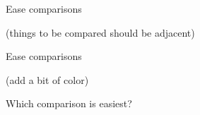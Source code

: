 \documentclass[aspectratio=169,12pt,t]{beamer}
\begin{document}
\begin{frame}{Ease comparisons}

\hilit (things to be compared should be adjacent)

\bigskip


\note{
}
\end{frame}





\begin{frame}{Ease comparisons}

\hilit (add a bit of color)

\bigskip


\note{
}
\end{frame}




\begin{frame}[c]{Which comparison is easiest?}


\note{
}
\end{frame}
\end{document}
